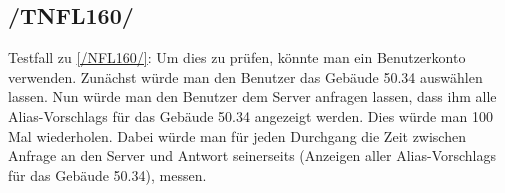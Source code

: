 \subsection*{/TNFL160/}
\label{/TNFL160/} Testfall zu \ref{/NFL160/}: Um dies zu prüfen, könnte man ein \Gls{Benutzer}konto verwenden. Zunächst würde man den \Gls{Benutzer} das Gebäude 50.34 auswählen lassen. Nun würde man den \Gls{Benutzer} dem \Gls{Server} anfragen lassen, dass ihm alle \Glspl{Alias-Vorschlag} für das Gebäude 50.34 angezeigt werden. Dies würde man 100 Mal wiederholen. Dabei würde man für jeden Durchgang die Zeit zwischen Anfrage an den \Gls{Server} und Antwort seinerseits (Anzeigen aller \Glspl{Alias-Vorschlag} für das Gebäude 50.34), messen.
